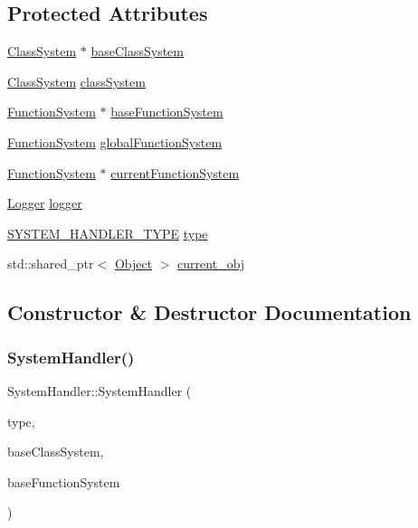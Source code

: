 \subsection*{Protected Attributes}
\begin{DoxyCompactItemize}
\item 
\hyperlink{classClassSystem}{Class\+System} $\ast$ \hyperlink{classSystemHandler_ab54036ced60be518459b1c4753667912}{base\+Class\+System}
\item 
\hyperlink{classClassSystem}{Class\+System} \hyperlink{classSystemHandler_ace6de39b5621a138654577c93f3ce9aa}{class\+System}
\item 
\hyperlink{classFunctionSystem}{Function\+System} $\ast$ \hyperlink{classSystemHandler_af601707ec9f56e24be4c0541a1c760f4}{base\+Function\+System}
\item 
\hyperlink{classFunctionSystem}{Function\+System} \hyperlink{classSystemHandler_a16b8444f364e1a4dd6db3b210fc8fa4e}{global\+Function\+System}
\item 
\hyperlink{classFunctionSystem}{Function\+System} $\ast$ \hyperlink{classSystemHandler_a5d29f688a621b074c2630470c31e6784}{current\+Function\+System}
\item 
\hyperlink{classLogger}{Logger} \hyperlink{classSystemHandler_aff3c17bc71f072c415a793a6114a5e68}{logger}
\item 
\hyperlink{statics_8h_a28f867553077bc713fdf8921a9226e2e}{S\+Y\+S\+T\+E\+M\+\_\+\+H\+A\+N\+D\+L\+E\+R\+\_\+\+T\+Y\+PE} \hyperlink{classSystemHandler_a8ca6090af683e8555051681fd31cd865}{type}
\item 
std\+::shared\+\_\+ptr$<$ \hyperlink{classObject}{Object} $>$ \hyperlink{classSystemHandler_a069c004c6108de742e7f2d9233c9ee77}{current\+\_\+obj}
\end{DoxyCompactItemize}


\subsection{Constructor \& Destructor Documentation}
\mbox{\label{classSystemHandler_abda0d6c76ea3eb8fa8e1493931e5d76b}} 
\subsubsection{\texorpdfstring{System\+Handler()}{SystemHandler()}}
{\footnotesize\ttfamily System\+Handler\+::\+System\+Handler (\begin{DoxyParamCaption}\item[{\hyperlink{statics_8h_a28f867553077bc713fdf8921a9226e2e}{S\+Y\+S\+T\+E\+M\+\_\+\+H\+A\+N\+D\+L\+E\+R\+\_\+\+T\+Y\+PE}}]{type,  }\item[{\hyperlink{classClassSystem}{Class\+System} $\ast$}]{base\+Class\+System,  }\item[{\hyperlink{classFunctionSystem}{Function\+System} $\ast$}]{base\+Function\+System }\end{DoxyParamCaption})}


